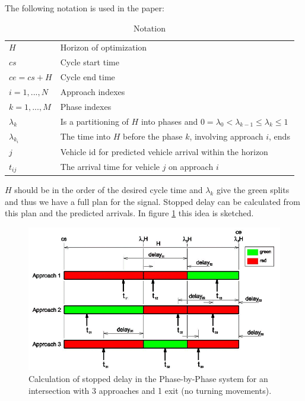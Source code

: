 The following notation is used in the paper:

\begin{table}[!ht]
\begin{center}
\begin{tabular}{ll}
\hline
$H$ & Horizon of optimization \\
$cs$ & Cycle start time \\
$ce = cs+H$ & Cycle end time \\
$i = 1,...,N$ & Approach indexes \\
$k = 1,...,M$ & Phase indexes \\
$\lambda_k$ &  Is a partitioning of $H$ into phases and $0 = \lambda_{0} <  \lambda_{k-1} \leq \lambda_k \leq 1$ \\
$\lambda_{k_i}$ & The time into $H$ before the phase $k$, involving approach $i$, ends \\
$j$ & Vehicle id for predicted vehicle arrival within the horizon  \\
$t_{ij}$ & The arrival time for vehicle $j$ on approach $i$
\\ \hline
\end{tabular}
\end{center}
\caption{Notation}
\end{table}

$H$ should be in the order of the desired cycle time and $\lambda_k$ give the green splits and thus we have a full plan for the signal. Stopped delay can be calculated from this plan and the predicted arrivals. In figure \ref{fig:pp_delay} this idea is sketched.

\begin{figure}[!ht]
\begin{center}
\includegraphics[scale=0.5]{phase-by-phase_delay-model.png} 
\end{center}
\caption{Calculation of stopped delay in the Phase-by-Phase system for an intersection with 3 approaches and 1 exit (no turning movements).}
\label{fig:pp_delay}
\end{figure}

